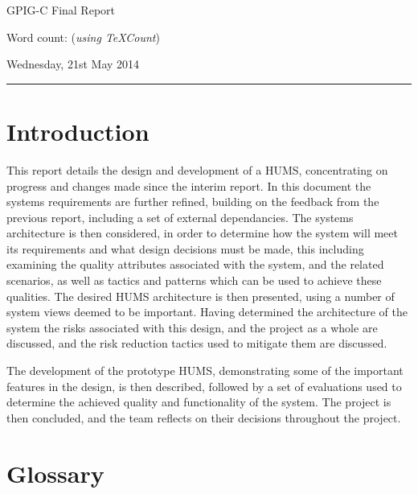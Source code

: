 \documentclass[10pt,a4paper]{article}
\begin{document}
\begin{center}
{\vspace*{-0.5cm}
\Huge GPIG-C Final Report}
\vspace*{0.2cm}

Word count:  (\textit{using TeXCount})
\vspace*{0.1cm}

Wednesday, 21st May 2014
\end{center}
\vspace*{0.4cm}
\hrule
\vspace*{0.4cm}

\section{Introduction}
\label{sec:intro}
This report details the design and development of a HUMS, concentrating on progress and changes made since the interim report. In this document the systems requirements are further refined, building on the feedback from the previous report, including a set of external dependancies. The systems architecture is then considered, in order to determine how the system will meet its requirements and what design decisions must be made, this including examining the quality attributes associated with the system, and the related scenarios, as well as tactics and patterns which can be used to achieve these qualities. The desired HUMS architecture is then presented, using a number of system views deemed to be important. Having determined the architecture of the system the risks associated with this design, and the project as a whole are discussed, and the risk reduction tactics used to mitigate them are discussed.

The development of the prototype HUMS, demonstrating some of the important features in the design, is then described, followed by a set of evaluations used to determine the achieved quality and functionality of the system. The project is then concluded, and the team reflects on their decisions throughout the project.

\section{Glossary}
\label{sec:glossary}
\end{document}
